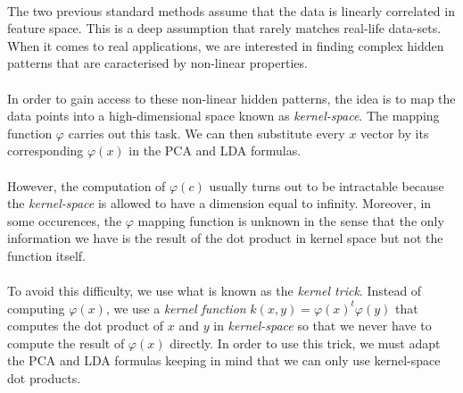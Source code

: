 \paragraph{}
The two previous standard methods assume that the data is linearly correlated in feature space. This
is a deep assumption that rarely matches real-life data-sets. When it comes to real applications, we
are interested in finding complex hidden patterns that are caracterised by non-linear properties.

\paragraph{}
In order to gain access to these non-linear hidden patterns, the idea is to map the data points into
a high-dimensional space known as \emph{kernel-space}. The mapping function $\varphi$ carries out
this task. We can then substitute every $x$ vector by its corresponding $\varphi(x)$ in the PCA and
LDA formulas.

\paragraph{}
However, the computation of $\varphi(c)$ usually turns out to be intractable because the
\emph{kernel-space} is allowed to have a dimension equal to infinity. Moreover, in some occurences,
the $\varphi$ mapping function is unknown in the sense that the only information we have is the
result of the dot product in kernel space but not the function itself.

\paragraph{}
To avoid this difficulty, we use what is known as the \emph{kernel trick}. Instead of computing
$\varphi(x)$, we use a \emph{kernel function} $k(x, y) = \varphi(x)^t\varphi(y)$ that computes
the dot product of $x$ and $y$ in \emph{kernel-space} so that we never have to compute the result of
$\varphi(x)$ directly. In order to use this trick, we must adapt the PCA and LDA formulas keeping in
mind that we can only use kernel-space dot products.
